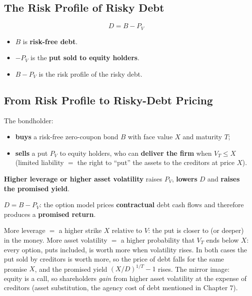 \subsection{The Risk Profile of Risky Debt}
\begin{keybox}
\[
\boxed{\,D=B-P_V\,}
\]
\begin{itemize}[leftmargin=*]
  \item $B$ is \textbf{risk-free debt}.
  \item $-P_V$ is the \textbf{put sold to equity holders}.
  \item $B-P_V$ is the risk profile of the risky debt.
\end{itemize}
\end{keybox}

\subsection{From Risk Profile to Risky-Debt Pricing}
The bondholder:
\begin{itemize}
  \item \textbf{buys} a risk-free zero-coupon bond $B$ with face value $X$ and maturity $T$;
  \item \textbf{sells} a put $P_V$ to equity holders, who can \textbf{deliver the firm} when $V_T\leq X$ (limited liability $=$ the right to ``put'' the assets to the creditors at price $X$).
\end{itemize}
\begin{keybox}
\textbf{Higher leverage or higher asset volatility} raises $P_V$, \textbf{lowers} $D$ and \textbf{raises the promised yield}.

$D=B-P_V$: the option model prices \textbf{contractual} debt cash flows and therefore produces a \textbf{promised return}.
\end{keybox}
\begin{addbox}
More leverage $=$ a higher strike $X$ relative to $V$: the put is closer to (or deeper) in the money. More asset volatility $=$ a higher probability that $V_T$ ends below $X$: every option, puts included, is worth more when volatility rises. In both cases the put sold by creditors is worth more, so the price of debt falls for the same promise $X$, and the promised yield $\left(X/D\right)^{1/T}-1$ rises. The mirror image: equity is a call, so shareholders \emph{gain} from higher asset volatility at the expense of creditors (asset substitution, the agency cost of debt mentioned in Chapter 7).
\end{addbox}

